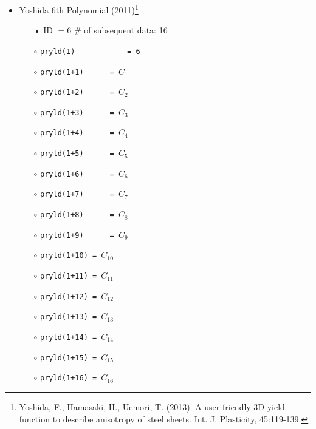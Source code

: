 \documentclass[11pt,a4paper,twoside,final,onecolumn,titlepage]{article}
\begin{document}
\begin{itemize}
	\item Yoshida 6th Polynomial (2011)\footnote{Yoshida, F., Hamasaki, H., Uemori, T. (2013). A user-friendly 3D yield function to describe anisotropy of steel sheets. Int. J. Plasticity, 45:119-139.}
	\begin{itemize}
		\item[•] ID $= 6$	\hspace{100pt}	\# of subsequent data: 16
		\item[$\circ$] \texttt{pryld(1)\,\,\,\,\,\,\,\,\,\,\,\,= 6}
		\item[$\circ$] \texttt{pryld(1+1)\,\,\,\,\,\,= $C_1$}
		\item[$\circ$] \texttt{pryld(1+2)\,\,\,\,\,\,= $C_2$}
		\item[$\circ$] \texttt{pryld(1+3)\,\,\,\,\,\,= $C_3$}
		\item[$\circ$] \texttt{pryld(1+4)\,\,\,\,\,\,= $C_4$}
		\item[$\circ$] \texttt{pryld(1+5)\,\,\,\,\,\,= $C_5$}
		\item[$\circ$] \texttt{pryld(1+6)\,\,\,\,\,\,= $C_6$}
		\item[$\circ$] \texttt{pryld(1+7)\,\,\,\,\,\,= $C_7$}
		\item[$\circ$] \texttt{pryld(1+8)\,\,\,\,\,\,= $C_8$}
		\item[$\circ$] \texttt{pryld(1+9)\,\,\,\,\,\,= $C_9$}
		\item[$\circ$] \texttt{pryld(1+10) = $C_{10}$}
		\item[$\circ$] \texttt{pryld(1+11) = $C_{11}$}
		\item[$\circ$] \texttt{pryld(1+12) = $C_{12}$}
		\item[$\circ$] \texttt{pryld(1+13) = $C_{13}$}
		\item[$\circ$] \texttt{pryld(1+14) = $C_{14}$}
		\item[$\circ$] \texttt{pryld(1+15) = $C_{15}$}
		\item[$\circ$] \texttt{pryld(1+16) = $C_{16}$}\\
	\end{itemize}
\end{itemize}
\end{document}
